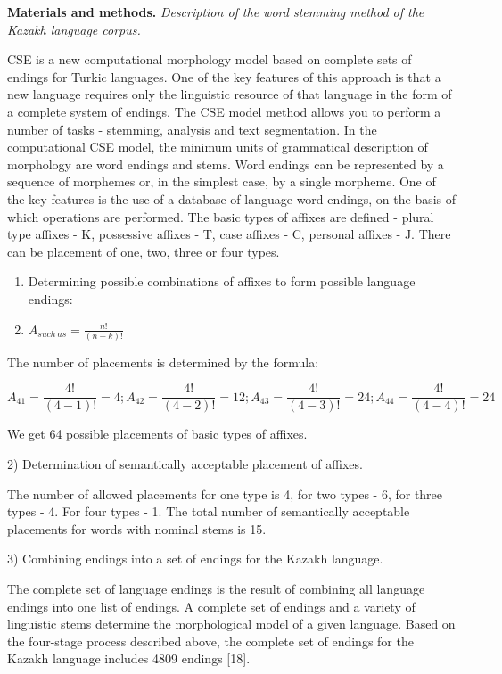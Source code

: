 \textbf{Materials and methods.} \emph{Description of the word stemming
method of the Kazakh language corpus.}

CSE is a new computational morphology model based on complete sets of
endings for Turkic languages. One of the key features of this approach
is that a new language requires only the linguistic resource of that
language in the form of a complete system of endings. The CSE model
method allows you to perform a number of tasks - stemming, analysis and
text segmentation. In the computational CSE model, the minimum units of
grammatical description of morphology are word endings and stems. Word
endings can be represented by a sequence of morphemes or, in the
simplest case, by a single morpheme. One of the key features is the use
of a database of language word endings, on the basis of which operations
are performed. The basic types of affixes are defined - plural type
affixes - K, possessive affixes - T, case affixes - C, personal affixes
- J. There can be placement of one, two, three or four types.

\begin{enumerate}
\def\labelenumi{\arabic{enumi})}
\item
  Determining possible combinations of affixes to form possible language
  endings:
\item
  \(A_{such\ as} = \frac{n!}{(n - k)!}\)
\end{enumerate}

The number of placements is determined by the formula:

\[A_{41} = \frac{4!}{(4 - 1)!} = 4;A_{42} = \frac{4!}{(4 - 2)!} = 12;A_{43} = \frac{4!}{(4 - 3)!} = 24;A_{44} = \frac{4!}{(4 - 4)!} = 24\]

We get 64 possible placements of basic types of affixes.

2) Determination of semantically acceptable placement of affixes.

The number of allowed placements for one type is 4, for two types - 6,
for three types - 4. For four types - 1. The total number of
semantically acceptable placements for words with nominal stems is 15.

3) Combining endings into a set of endings for the Kazakh language.

The complete set of language endings is the result of combining all
language endings into one list of endings. A complete set of endings and
a variety of linguistic stems determine the morphological model of a
given language. Based on the four-stage process described above, the
complete set of endings for the Kazakh language includes 4809 endings
{[}18{]}.

